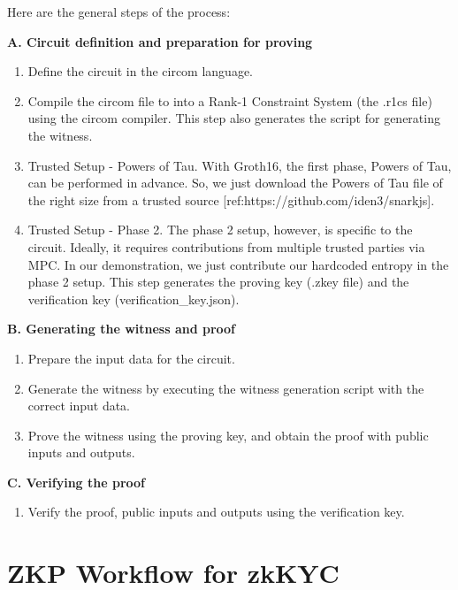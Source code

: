 \documentclass[
]{report}
\providecommand{\tightlist}{%
  \setlength{\itemsep}{0pt}\setlength{\parskip}{0pt}}
\begin{document}
Here are the general steps of the process:

\textbf{A. Circuit definition and preparation for proving}

\begin{enumerate}
\def\labelenumi{\arabic{enumi}.}
\tightlist
\item
  Define the circuit in the circom language.
\item
  Compile the circom file to into a Rank-1 Constraint System (the .r1cs
  file) using the circom compiler. This step also generates the script
  for generating the witness.
\item
  Trusted Setup - Powers of Tau. With Groth16, the first phase, Powers
  of Tau, can be performed in advance. So, we just download the Powers
  of Tau file of the right size from a trusted source
  {[}ref:https://github.com/iden3/snarkjs{]}.
\item
  Trusted Setup - Phase 2. The phase 2 setup, however, is specific to
  the circuit. Ideally, it requires contributions from multiple trusted
  parties via MPC. In our demonstration, we just contribute our
  hardcoded entropy in the phase 2 setup. This step generates the
  proving key (.zkey file) and the verification key
  (verification\_key.json).
\end{enumerate}

\textbf{B. Generating the witness and proof}

\begin{enumerate}
\def\labelenumi{\arabic{enumi}.}
\tightlist
\item
  Prepare the input data for the circuit.
\item
  Generate the witness by executing the witness generation script with
  the correct input data.
\item
  Prove the witness using the proving key, and obtain the proof with
  public inputs and outputs.
\end{enumerate}

\textbf{C. Verifying the proof}

\begin{enumerate}
\def\labelenumi{\arabic{enumi}.}
\tightlist
\item
  Verify the proof, public inputs and outputs using the verification
  key.
\end{enumerate}

\section{ZKP Workflow for zkKYC}
\end{document}
